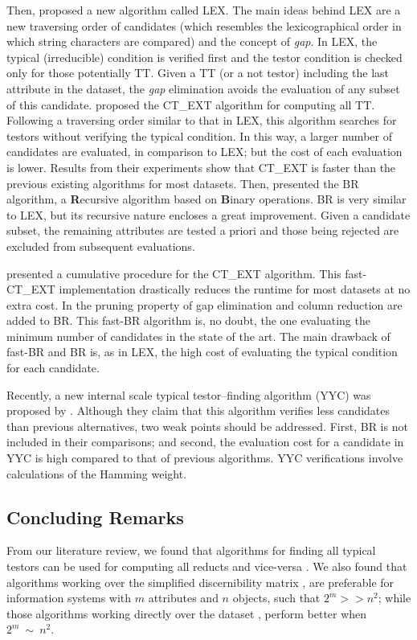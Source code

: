 \documentclass[authoryear,preprint,review,12pt]{elsarticle}
\begin{document}
  Then, \cite{Santiesteban03} proposed a new algorithm called LEX. The main ideas behind LEX are a new traversing
  order of candidates (which resembles the lexicographical order in which string characters are compared) and the
  concept of \emph{gap}. In LEX, the typical (irreducible) condition is verified first and the testor condition 
  is checked only for those potentially TT. Given a TT (or a not testor) including the last attribute in the
  dataset, the \emph{gap} elimination avoids the evaluation of any subset of this candidate. \cite{Sanchez07}
  proposed the CT\_EXT algorithm for computing all TT. Following a traversing order similar to that in LEX, this
  algorithm searches for testors without verifying the typical condition. In this way, a larger number of 
  candidates are evaluated, in comparison to LEX; but the cost of each evaluation is lower. Results from their
  experiments show that CT\_EXT is faster than the previous existing algorithms for most datasets. Then,
  \cite{Lias09} presented the BR algorithm, a \textbf{R}ecursive algorithm based on \textbf{B}inary operations. 
  BR is very similar to LEX, but its recursive nature encloses a great improvement. Given a candidate subset, the 
  remaining attributes are tested a priori and those being rejected are excluded from subsequent evaluations. 
  
  \cite{Sanchez10} presented a cumulative procedure for the CT\_EXT algorithm. This fast-CT\_EXT implementation
  drastically reduces the runtime for most datasets at no extra cost. In \citep{Lias13} the pruning property of
  gap elimination and column reduction are added to BR. This fast-BR algorithm is, no doubt, the one 
  evaluating the minimum number of candidates in the state of the art. The main drawback of fast-BR and 
  BR is, as in LEX, the high cost of evaluating the typical condition for each candidate.
  
  Recently, a new internal scale typical testor--finding algorithm (YYC) was proposed by \cite{Alba14}. 
  Although they claim that this algorithm verifies less candidates than previous alternatives, two weak points
  should be addressed. First, BR is not included in their comparisons; and second, the evaluation cost for a
  candidate in YYC is high compared to that of previous algorithms. YYC verifications involve calculations of the 
  Hamming weight.
  
 \subsection{Concluding Remarks} 
  From our literature review, we found that algorithms for finding all typical testors can be used for computing all reducts and vice-versa \citep{Lazo15}. We also found that algorithms working over the simplified discernibility matrix \citep{Sanchez10,Chen2012,Lias13}, are preferable for information systems with $m$ attributes and $n$ objects, such that $2^m >> n^2$; while those algorithms working directly over the dataset \citep{Shulcloper95b,WangP07}, perform better when $2^m~\sim~n^2$. 
  
\end{document}

